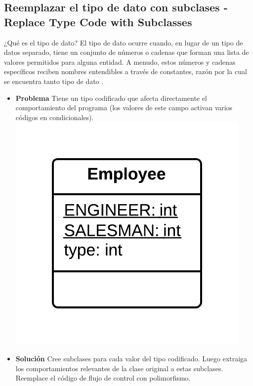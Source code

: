 \documentclass[11pt,a4paper,oneside]{book}
\begin{document}
\subsection{Reemplazar el tipo de dato con subclases -  Replace Type Code with Subclasses}
¿Qué es el tipo de dato? El tipo de dato ocurre cuando, en lugar de un tipo de datos separado, tiene un conjunto de números o cadenas que forman una lista de valores permitidos para alguna entidad. A menudo, estos números y cadenas específicos reciben nombres entendibles a través de constantes, razón por la cual se encuentra tanto tipo de dato .
\label{replacetypecodewithsubclasses}
\begin{itemize}
    \item \textbf{Problema} Tiene un tipo codificado que afecta directamente el comportamiento del programa (los valores de este campo activan varios códigos en condicionales).\\
    \centering \includegraphics[scale=0.2]{replacetypecodewithsubclassesproblem}
    \item \textbf{Solución} Cree subclases para cada valor del tipo codificado. Luego extraiga los comportamientos relevantes de la clase original a estas subclases. Reemplace el código de flujo de control con polimorfismo.\\

\end{itemize}
\end{document}
